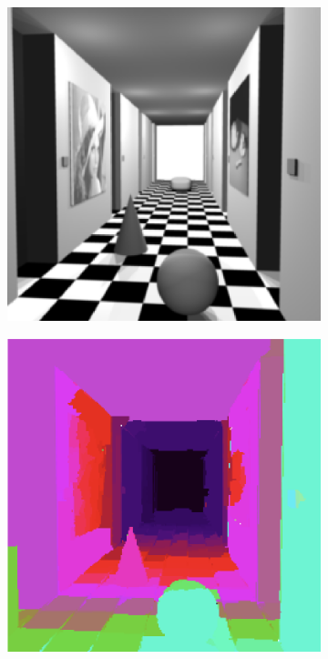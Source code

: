 \begin{figure}[h]
	\centering
	\begin{subfigure}{.3\textwidth}
		\centering
		\includegraphics[width=\linewidth]{Figures/SOA/wood1.png}
	\end{subfigure}
	\begin{subfigure}{.3\textwidth}
		
		\centering
		\includegraphics[width=\linewidth]{Figures/SOA/wood2.png}
	\end{subfigure}
	\begin{subfigure}{.3\textwidth}
		

\end{subfigure}
\end{figure}
